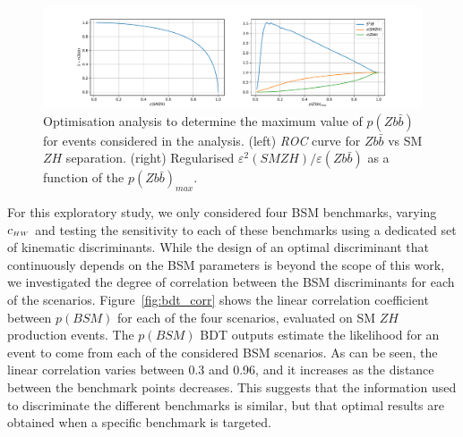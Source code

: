 \begin{figure}
\centering
\includegraphics[width=\textwidth]{plots/bkg_cut_opt.pdf}
\caption{
\label{fig:s2_over_b}
Optimisation analysis to determine the maximum value of $p(Z b\bar{b})$ for events
considered in the analysis. (left) {\it ROC} curve for $Z b\bar{b}$ vs SM $Z H$
separation. (right) Regularised $\varepsilon^2(SM Z H) /
\varepsilon(Zb\bar{b})$ as a function of the $p(Z b\bar{b})_{max}$.
}
\end{figure}

For this exploratory study, we only considered four BSM benchmarks, varying $c_{\scriptscriptstyle HW}$ and testing the
sensitivity to each of these benchmarks using a dedicated set of kinematic
discriminants. While the design of an optimal discriminant that continuously depends on
the BSM parameters is beyond the scope of this work, we investigated the degree of
correlation between the BSM discriminants for each of the scenarios.
Figure~\ref{fig:bdt_corr} shows the linear correlation coefficient between $p(BSM)$ for
each of the four scenarios, evaluated on SM $Z H$ production events. The $p(BSM)$
BDT outputs estimate the likelihood for an event to come from each of the considered BSM
scenarios.
As can be seen,
the linear correlation varies between 0.3 and 0.96, and it increases as the distance
between the benchmark points decreases. This suggests that the information used to
discriminate the different benchmarks is similar, but that optimal results are obtained
when a specific benchmark is targeted.

%

